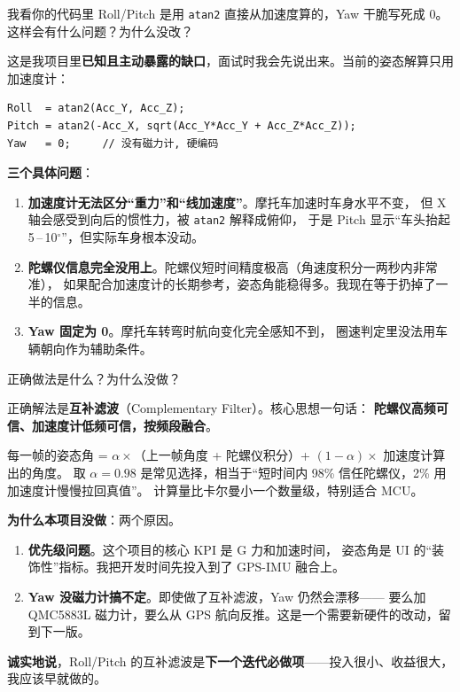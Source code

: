 \documentclass[UTF8,11pt,a4paper]{ctexart}
\begin{document}
\begin{interviewer}
我看你的代码里 Roll/Pitch 是用 \texttt{atan2} 直接从加速度算的，Yaw 干脆写死成 0。
这样会有什么问题？为什么没改？
\end{interviewer}

\begin{candidate}
这是我项目里\textbf{已知且主动暴露的缺口}，面试时我会先说出来。当前的姿态解算只用加速度计：
\begin{lstlisting}
Roll  = atan2(Acc_Y, Acc_Z);
Pitch = atan2(-Acc_X, sqrt(Acc_Y*Acc_Y + Acc_Z*Acc_Z));
Yaw   = 0;     // 没有磁力计, 硬编码
\end{lstlisting}

\textbf{三个具体问题}：
\begin{enumerate}[leftmargin=1.4em,topsep=2pt,itemsep=2pt]
  \item \textbf{加速度计无法区分``重力''和``线加速度''}。摩托车加速时车身水平不变，
        但 X 轴会感受到向后的惯性力，被 \texttt{atan2} 解释成俯仰，
        于是 Pitch 显示``车头抬起 5\,–\,10$^\circ$''，但实际车身根本没动。
  \item \textbf{陀螺仪信息完全没用上}。陀螺仪短时间精度极高（角速度积分一两秒内非常准），
        如果配合加速度计的长期参考，姿态角能稳得多。我现在等于扔掉了一半的信息。
  \item \textbf{Yaw 固定为 0}。摩托车转弯时航向变化完全感知不到，
        圈速判定里没法用车辆朝向作为辅助条件。
\end{enumerate}
\end{candidate}

\begin{interviewer}
正确做法是什么？为什么没做？
\end{interviewer}

\begin{candidate}
正确解法是\textbf{互补滤波}（Complementary Filter）。核心思想一句话：
\textbf{陀螺仪高频可信、加速度计低频可信，按频段融合}。

每一帧的姿态角 = $\alpha \times$（上一帧角度 + 陀螺仪积分）+ $(1-\alpha) \times$ 加速度计算出的角度。
取 $\alpha = 0.98$ 是常见选择，相当于``短时间内 98\% 信任陀螺仪，2\% 用加速度计慢慢拉回真值''。
计算量比卡尔曼小一个数量级，特别适合 MCU。

\medskip
\textbf{为什么本项目没做}：两个原因。
\begin{enumerate}[leftmargin=1.4em,topsep=2pt,itemsep=2pt]
  \item \textbf{优先级问题}。这个项目的核心 KPI 是 G 力和加速时间，
        姿态角是 UI 的``装饰性''指标。我把开发时间先投入到了 GPS-IMU 融合上。
  \item \textbf{Yaw 没磁力计搞不定}。即使做了互补滤波，Yaw 仍然会漂移——
        要么加 QMC5883L 磁力计，要么从 GPS 航向反推。这是一个需要新硬件的改动，留到下一版。
\end{enumerate}

\medskip
\textbf{诚实地说}，Roll/Pitch 的互补滤波是\textbf{下一个迭代必做项}——投入很小、收益很大，
我应该早就做的。
\end{candidate}
\end{document}
